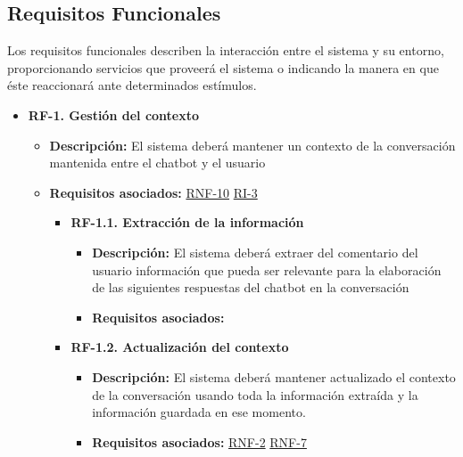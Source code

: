 \subsection{Requisitos Funcionales}

Los requisitos funcionales describen la interacción entre el sistema y su entorno, proporcionando servicios que proveerá el sistema o indicando la manera en que éste reaccionará ante determinados estímulos.

\begin{itemize}
    \item \textbf{RF-1. Gestión del contexto} \label{RF-1}
    \begin{itemize}
        \item \textbf{Descripción:} El sistema deberá mantener un contexto de la conversación mantenida entre el chatbot y el usuario
        \item \textbf{Requisitos asociados:} \hyperref[RNF-10]{RNF-10} \hyperref[RI-3]{RI-3}
        \begin{itemize}
            \item \textbf{RF-1.1. Extracción de la información}
            \begin{itemize}
                \item \textbf{Descripción:} El sistema deberá extraer del comentario del usuario información que pueda ser relevante para la elaboración de las siguientes respuestas del chatbot en la conversación
                \item \textbf{Requisitos asociados:} 
            \end{itemize}
            
            \item \textbf{RF-1.2. Actualización del contexto} \label{RF-1.2}
            \begin{itemize}
                \item \textbf{Descripción:} El sistema deberá mantener actualizado el contexto de la conversación usando toda la información extraída y la información guardada en ese momento. 
                \item \textbf{Requisitos asociados:} \hyperref[RNF-2]{RNF-2} \hyperref[RNF-7]{RNF-7}
            \end{itemize}
        \end{itemize}
    \end{itemize}
    

\end{itemize}

